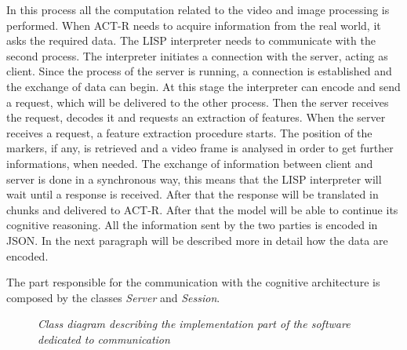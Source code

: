 In this process all the computation related to the video and image processing is performed. When ACT-R needs to acquire information from the real world, it asks the required data. The LISP interpreter needs to communicate with the second process. The interpreter initiates a connection with the server, acting as client. Since the process of the server is running, a connection is established and the exchange of data can begin. At this stage the interpreter can encode and send a request, which will be delivered to the other process. Then the server receives the request, decodes it and requests an extraction of features.
		When the server receives a request, a feature extraction procedure starts. The position of the markers, if any, is retrieved and a video frame is analysed in order to get further informations, when needed. The exchange of information between client and server is done in a synchronous way, this means that the LISP interpreter will wait until a response is received.
		After that the response will be translated in chunks and delivered to ACT-R. After that the model will be able to continue its cognitive reasoning. All the information sent by the two parties is encoded in JSON. In the next paragraph will be described more in detail how the data are encoded.



		The part responsible for the communication with the cognitive architecture is composed by the classes \emph{Server} and \emph{Session}. 

		\begin{figure}[h]
		  \begin{center} 
		  \end{center} 
		  \caption{\textit{Class diagram describing the implementation part of the software dedicated to communication}}  
		  \label{fig:impl_feat_extraction}
	 	\end{figure}	


